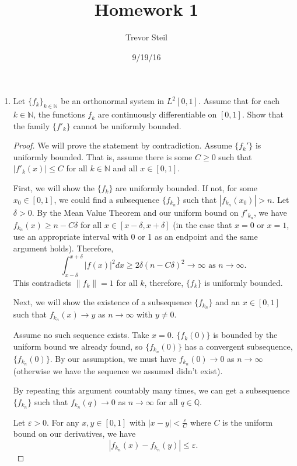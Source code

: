 \documentclass[a4paper]{article}
\title{Homework 1 }
\date{9/19/16}
\author{Trevor Steil}
\newcommand{\N}{\mathbb{N}}
\newcommand{\Q}{\mathbb{Q}}
\begin{document}
\maketitle

\begin{enumerate}

\item Let $\{ f_k \}_{k\in \mathbb N}$ be an orthonormal system in $L^2 [0,1]$. Assume that for each $k\in \mathbb N$, the functions $f_k$ are continuously differentiable on $[0,1]$. Show that the family $\{ f'_k \}$ cannot be uniformly bounded.

  \begin{proof}

    We will prove the statement by contradiction. Assume $\{ f_k' \}$ is uniformly bounded. That is, assume there is some $C \geq 0$ such that
    $|f'_k(x)| \leq C$ for all $k \in \N$ and all $x \in [0,1]$.

    First, we will show the $\{ f_k \}$ are uniformly bounded. If not, for some $x_0 \in [0,1]$, we could find a subsequence $\{ f_{k_n} \}$ such that
    $| f_{k_n}(x_0) | > n$. Let $\delta > 0$. By the Mean Value Theorem and our uniform bound on $f'_{k_n}$, we have $f_{k_n}(x) \geq n - C \delta$
    for all $x \in [x - \delta, x + \delta]$ (in the case that $x=0$ or $x=1$, use an appropriate interval with 0 or 1 as an endpoint and the same
    argument holds). Therefore,
    \[ \int_{x-\delta}^{x+\delta} | f(x) |^2 dx \geq 2 \delta (n - C \delta)^2 \to \infty \text{ as } n \to \infty .\]
    This contradicts $\|f_k\| = 1$ for all $k$, therefore, $\{ f_k \}$ is uniformly bounded.

    Next, we will show the existence of a subsequence $\{ f_{k_n} \}$ and an $x \in [0,1]$ such that $f_{k_n}(x) \to y$ as $n \to \infty$ with $y \neq
    0$.

    Assume no such sequence exists. Take $x = 0$. $\{ f_k(0) \}$ is bounded by the uniform bound we already found, so $\{ f_{k_n}(0) \}$ has a
    convergent subsequence, $\{ f_{k_n} (0) \}$. By our assumption, we must have $f_{k_n}(0) \to 0$ as $n \to \infty$ (otherwise we have the sequence
    we assumed didn't exist).

    By repeating this argument countably many times, we can get a subsequence $\{ f_{k_n} \}$ such that $f_{k_n}(q) \to 0$ as $n \to \infty$ for all
    $q \in \Q$.

    Let $\varepsilon >0$. For any $x,y \in [0,1]$ with $|x-y| < \frac{\varepsilon}{C}$ where $C$ is the uniform bound on our derivatives, we have
    \[ | f_{k_n}(x) - f_{k_n}(y) | \leq \varepsilon .\]


\end{proof}
\end{enumerate}
\end{document}
